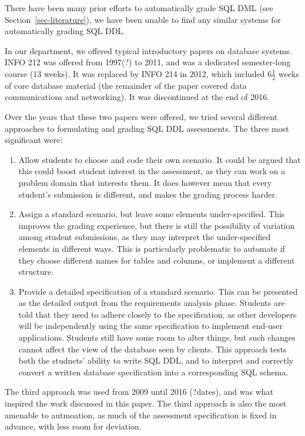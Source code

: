 \documentclass[sigconf, authordraft]{acmart}
\begin{document}
There have been many prior efforts to automatically grade SQL DML (see Section~\ref{sec-literature}), we have been unable to find any similar systems for automatically grading SQL DDL.

In our department, we offered typical introductory papers on database systems. INFO 212 was offered from 1997(?) to 2011, and was a dedicated semester-long course (13 weeks). It was replaced by INFO 214 in 2012, which included 6\(\frac{1}{2}\) weeks of core database material (the remainder of the paper covered data communications and networking). It was discontinued at the end of 2016.

Over the years that these two papers were offered, we tried several different approaches to formulating and grading SQL DDL assessments. The three most significant were:
\begin{enumerate}
    \item Allow students to choose and code their own scenario. It could be argued that this could boost student interest in the assessment, as they can work on a problem domain that interests them. It does however mean that every student's submission is different, and makes the grading process harder.
    
    \item Assign a standard scenario, but leave some elements under-specified. This improves the grading experience, but there is still the possibility of variation among student submissions, as they may interpret the under-specified elements in different ways. This is particularly problematic to automate if they choose different names for tables and columns, or implement a different structure.
    
    \item Provide a detailed specification of a standard scenario. This can be presented as the detailed output from the requirements analysis phase. Students are told that they need to adhere closely to the specification, as other developers will be independently using the same specification to implement end-user applications. Students still have some room to alter things, but such changes cannot affect the view of the database seen by clients. This approach tests both the studnets' ability to write SQL DDL, and to interpret and correctly convert a written database specification into a corresponding SQL schema.
\end{enumerate}

The third approach was used from 2009 until 2016 (?dates), and was what inspired the work discussed in this paper. The third approach is also the most amenable to autmoation, as much of the assessment specification is fixed in advance, with less room for deviation.
\end{document}
